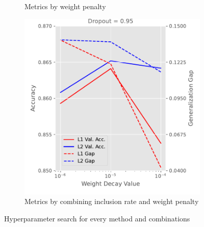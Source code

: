 {{\begin{figure}[t]
\begin{subfigure}{.3\linewidth}
        \caption{Metrics by weight penalty}
        \label{fig:weightrates}
    \end{subfigure} 
    \begin{subfigure}{.3\linewidth}
        \centering
        \includegraphics[width=1\linewidth]{figures/combined-val-acc-gen-gap-line.pdf}
        \caption{Metrics by combining inclusion rate and weight penalty}
        \label{fig:extra}
    \end{subfigure} 
    \caption{Hyperparameter search for every method and combinations}
    \label{fig:hp_search}
\end{figure}
}
}


\newcommand{\questionTableOne} {
\youranswer{
%
\begin{table}[t]
    \centering
    \begin{tabular}{c|cc}
    \toprule
        \# hidden units & val. acc. & generalization gap \\
    \midrule
         32            &      77.94\%      &      0.148              \\
         64            &      80.91\%      &      0.344              \\
         128           &      80.92\%      &      0.803              \\ 
    \bottomrule
    \end{tabular}
    \caption{Validation accuracy (\%) and generalization gap (in terms of cross-entropy error) for varying network widths on the EMNIST dataset.}
    \label{tab:width_exp}
\end{table}
}
}

